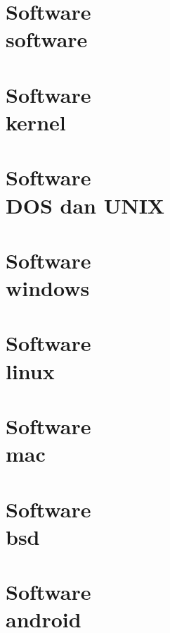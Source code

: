 \documentclass{WileySix}
\begin{document}
\chapter[Software]
{Software\\ software}


%

\chapter[Kernel]
{Software\\ kernel}


\chapter[Perintah DOS dan UNIX]
{Software\\ DOS dan UNIX}


\chapter[Windows]
{Software\\ windows}


\chapter[Linux]
{Software\\ linux}


\chapter[Macintosh]
{Software\\ mac}


\chapter[Free BSD]
{Software\\ bsd}


\chapter[Android]
{Software\\ android}

\end{document}
